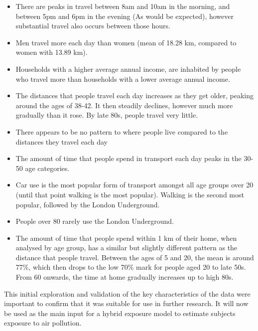 \begin{itemize}
\item There are peaks in travel between 8am and 10am in the morning, and between 5pm and 6pm in the evening (As would be expected), however substantial travel also occurs between those hours.
\item Men travel more each day than women (mean of 18.28 km, compared to women with 13.89 km).
\item Households with a higher average annual income, are inhabited by people who travel more than households with a lower average annual income.
\item The distances that people travel each day increases as they get older, peaking around the ages of 38-42. It then steadily declines, however much more gradually than it rose. By late 80s, people travel very little.
\item There appears to be no pattern to where people live compared to the distances they travel each day
\item The amount of time that people spend in transport each day peaks in the 30-50 age categories.
\item Car use is the most popular form of transport amongst all age groups over 20 (until that point walking is the most popular). Walking is the second most popular, followed by the London Underground.
\item People over 80 rarely use the London Underground.
\item The amount of time that people spend within 1 km of their home, when analysed by age group, has a similar but slightly different pattern as the distance that people travel. Between the ages of 5 and 20, the mean is around 77\%, which then drops to the low 70\% mark for people aged 20 to late 50s. From 60 onwards, the time at home gradually increases up to high 80s.
\end{itemize}

This initial exploration and validation of the key characteristics of the data were important to confirm that it was suitable for use in further research. It will now be used as the main input for a hybrid exposure model to estimate subjects exposure to air pollution. 